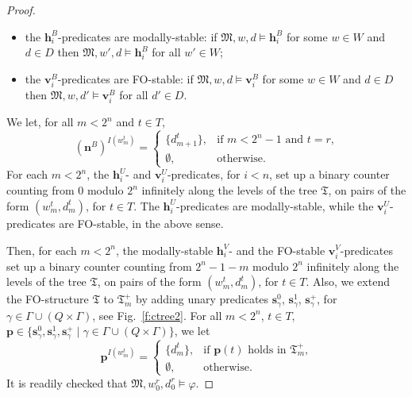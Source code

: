 \documentclass{lmcs} %
\theoremstyle{plain}\newtheorem{satz}[thm]{Satz} %
\newcommand{\fform}[1]{\boldsymbol{#1}}
\newcommand{\pvar}{\fform{p}}
\newcommand{\svar}{\fform{s}}
\newcommand{\hvar}{\fform{h}}
\newcommand{\vvar}{\fform{v}}
\newcommand{\cR}{B}
\newcommand{\cU}{U}
\newcommand{\cV}{V}
\newcommand{\nextR}{\fform{n}^\cR}
\newcommand{\treemod}{\mathfrak T}
\newcommand{\treedom}{T}
\newcommand{\treet}{t}
\begin{document}
\begin{proof}
\begin{itemize}
			\item[--]
			the $\hvar^\cR_i$-predicates are modally-stable:  if $\mathfrak M,w,d\models\hvar^\cR_i$ for some
			$w\in W$ and $d\in D$ then
			$\mathfrak M,w',d\models\hvar^\cR_i$ for all $w'\in W$;
			
			\item[--]
			the $\vvar^\cR_i$-predicates are FO-stable:  if $\mathfrak M,w,d\models\vvar^\cR_i$ for some
			$w\in W$ and $d\in D$ then
			$\mathfrak M,w,d'\models\vvar^\cR_i$ for all $d'\in D$.
		\end{itemize}
		We let, for all $m<2^n$ and $\treet\in\treedom$,
		\[
		( \nextR)^{I(w_m^\treet)}  = \left\{
		\begin{array}{ll}
			\{d_{m+1}^{\treet}\}, & \mbox{if $m<2^n\mathop{-}1$ and $\treet=r$,}\\[3pt]
			\emptyset, &\mbox{otherwise.}
		\end{array}
		\right.
		\]
		For each $m<2^n$, the $\hvar^\cU_i$- and $\vvar^\cU_i$-predicates, for $i<n$, set up a binary counter counting from $0$ modulo $2^n$ infinitely along the levels of the tree $\treemod$, on pairs of the form $(w_m^t,d_m^t)$, for $t\in\treedom$. The $\hvar^\cU_i$-predicates are modally-stable, while the $\vvar^\cU_i$-predicates are FO-stable, in the above sense.
		



		Then, for each $m<2^n$, the modally-stable $\hvar^\cV_i$- and the FO-stable $\vvar^\cV_i$-predicates set up a binary counter counting from $2^n-1-m$ modulo $2^n$ infinitely along the levels of the tree $\treemod$, on pairs of the form $(w_m^t,d_m^t)$, for $t\in\treedom$. Also,
		we extend the FO-structure $\treemod$ to $\treemod_m^+$ by adding 
		unary predicates
		$\svar_\gamma^0$, $\svar_\gamma^1$, $\svar_\gamma^+$, for $\gamma\in\Gamma\cup(Q\times\Gamma)$, see Fig.~\ref{f:ctree2}. 
		For all $m<2^n$, 
		$\treet\in\treedom$, $\pvar\in\{\svar_\gamma^0,\svar_\gamma^1,\svar_\gamma^+\mid \gamma\in\Gamma\cup(Q\times\Gamma)\}$, we let 
		\[
		\pvar^{I(w_m^\treet)}  = \left\{
		\begin{array}{ll}
			\{d_m^{\treet}\},  & \mbox{if $\pvar(\treet)$ holds in $\treemod_m^+$,}\\[3pt]
			\emptyset, &\mbox{otherwise.}
		\end{array}
		\right.
		\]
		It is readily checked that $\mathfrak M,w_0^r,d_0^r\models\varphi$. 
		

\end{proof}
\end{document}
